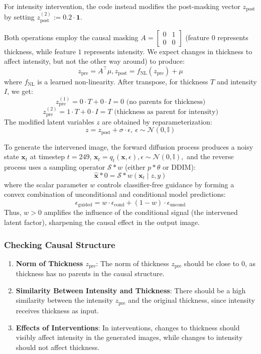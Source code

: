 \documentclass{article}
\newcommand{\x}{\mathbf{x}}
\newcommand{\N}{\mathcal{N}}
\begin{document}
	For intensity intervention, the code instead modifies the post-masking vector $z_{\text{post}}$ by setting $z_{\text{post}}^{(2)} := 0.2 \cdot \mathbf{1}$.
	
	Both operations employ the causal masking $A = \begin{bmatrix} 0 & 1 \\ 0 & 0 \end{bmatrix}$ (feature $0$ represents thickness, while feature $1$ represents intensity. We expect changes in thickness to affect intensity, but not the other way around) to produce: $$z_{\text{pre}} = A^\intercal \mu, z_{\text{post}} = f_{\text{NL}}(z_{\text{pre}}) + \mu$$ where $f_{\text{NL}}$ is a learned non-linearity. After transpose, for thickness $T$ and intensity $I$, we get:
	$$ z_\text{pre}^{(1)} = 0 \cdot T + 0 \cdot I = 0 \text{ (no parents for thickness)} $$
	$$ z_\text{pre}^{(2)} = 1 \cdot T + 0 \cdot I = T \text{ (thickness as parent for intensity)}$$
	The modified latent variables $z$ are obtained by reparameterization: $$z = z_{\text{post}} + \sigma \cdot \epsilon, \ \epsilon \sim \N(0,\mathbb{I})$$
	
	To generate the intervened image, the forward diffusion process produces a noisy state $\x_t$ at timestep $t=249$, $\x_t = q_t(\x, \epsilon), \epsilon \sim \N(0, \mathbb{I}),$
	and the reverse process uses a sampling operator $\mathcal{S}*w$ (either $p*{\theta}$ or DDIM):
	$$\hat{\x}*0 = \mathcal{S}*w(\x_t \mid z, y)$$
	where the scalar parameter $w$ controls classifier-free guidance by forming a convex combination of unconditional and conditional model predictions:
	$$\epsilon_{\text{guided}} = w \cdot \epsilon_{\text{cond}} + (1 - w) \cdot \epsilon_{\text{uncond}}$$
	Thus, $w > 0$ amplifies the influence of the conditional signal (the intervened latent factor), sharpening the causal effect in the output image.
	
	\subsubsection*{Checking Causal Structure}
	
	\begin{enumerate}
		\item \textbf{Norm of Thickness $ z_{\text{pre}} $}: The norm of thickness $ z_{\text{pre}} $ should be close to 0, as thickness has no parents in the causal structure.
		
		\item \textbf{Similarity Between Intensity and Thickness}: There should be a high similarity between the intensity $ z_{\text{pre}} $ and the original thickness, since intensity receives thickness as input.
		
		\item \textbf{Effects of Interventions}: In interventions, changes to thickness should visibly affect intensity in the generated images, while changes to intensity should not affect thickness.
	\end{enumerate}
	
\end{document}
